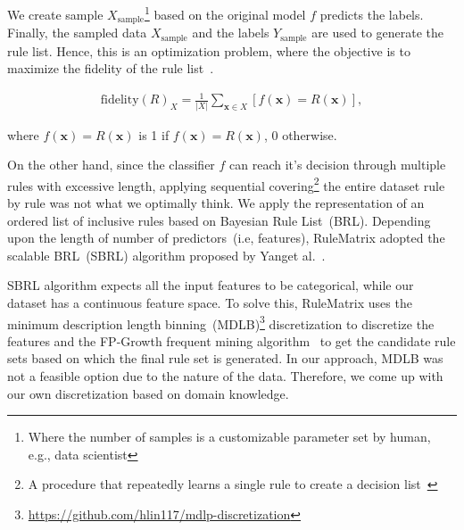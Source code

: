 We create sample ${X}_{\text {sample}}$\footnote{Where the number of samples is a customizable parameter set by human, e.g., data scientist} based on the original model $f$ predicts the labels. Finally, the sampled data ${X}_{\text {sample}}$ and the labels ${Y}_{\text {sample}}$ are used to generate the rule list. Hence, this is an optimization problem, where the objective is to maximize the fidelity of the rule list~\cite{ming2018rulematrix}.  

\vspace{-6mm}
\begin{align}
    \text {fidelity}(R)_{{X}}=\frac{1}{|{X}|} \sum_{\boldsymbol{x} \in {X}}[f(\boldsymbol{x})=R(\boldsymbol{x})],
    \label{eq:fidelity}
\end{align}

\hspace*{3.5mm} where $f(\boldsymbol{x})=R(\boldsymbol{x})$ is 1 if $f(\boldsymbol{x})=R(\boldsymbol{x})$, 0 otherwise. 

\hspace*{3.5mm} On the other hand, since the classifier $f$ can reach it's decision through multiple rules with excessive length, applying sequential covering\footnote{A procedure that repeatedly learns a single rule to create a decision list~\cite{molnar2019interpretable}} the entire dataset rule by rule was not what we optimally think. We apply the representation of an ordered list of inclusive rules based on Bayesian Rule List~(BRL). Depending upon the length of number of predictors~(i.e, features), RuleMatrix adopted the scalable BRL~(SBRL) algorithm proposed by Yanget al.~\cite{BayesianRule}. 

SBRL algorithm expects all the input features to be categorical, while our dataset has a continuous feature space. To solve this, RuleMatrix uses the minimum description length binning~(MDLB)\footnote{\url{https://github.com/hlin117/mdlp-discretization}} discretization to discretize the features and the FP-Growth frequent mining algorithm~\cite{han2000mining} to get the candidate rule sets based on which the final rule set is generated. In our approach, MDLB was not a feasible option due to the nature of the data. Therefore, we come up with our own discretization based on domain knowledge.

